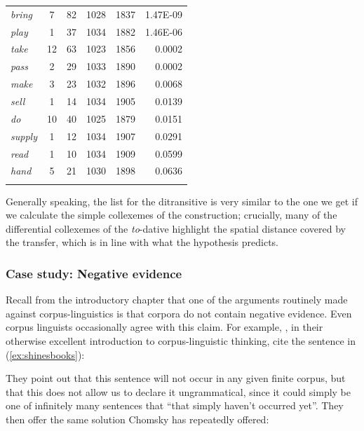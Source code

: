 \begin{table}[!htbp]
{\begin{tabular}[t]{l *{4}{S[table-format=5]} r}
\midrule
\textit{bring} & 7 & 82 & 1028 & 1837 & 1.47E-09 \\
\textit{play} & 1 & 37 & 1034 & 1882 & 1.46E-06 \\
\textit{take} & 12 & 63 & 1023 & 1856 & 0.0002 \\
\textit{pass} & 2 & 29 & 1033 & 1890 & 0.0002 \\
\textit{make} & 3 & 23 & 1032 & 1896 & 0.0068 \\
\textit{sell} & 1 & 14 & 1034 & 1905 & 0.0139 \\
\textit{do} & 10 & 40 & 1025 & 1879 & 0.0151 \\
\textit{supply} & 1 & 12 & 1034 & 1907 & 0.0291 \\
\textit{read} & 1 & 10 & 1034 & 1909 & 0.0599 \\
\textit{hand} & 5 & 21 & 1030 & 1898 & 0.0636 \\
\lspbottomrule
\end{tabular}}
\end{table}

Generally speaking, the list for the ditransitive is very similar to the one we get if we calculate the simple collexemes of the construction; crucially, many of the differential collexemes of the \textit{to}-dative highlight the spatial distance covered by the transfer, which is in line with what the hypothesis predicts.

\subsubsection{Case study: Negative evidence}
\label{sec:negativeevidence}

Recall from the introductory chapter that one of the arguments routinely made against corpus-linguistics is that corpora do not contain negative evidence. Even corpus linguists occasionally agree with this claim. For example, \citet[11]{mcenery_corpus_2001}, in their otherwise excellent introduction to corpus-linguistic thinking, cite the sentence in (\ref{ex:shinesbooks}):

\begin{exe}
\label{ex:shinesbooks}
\end{exe}

They point out that this sentence will not occur in any given finite corpus, but that this does not allow us to declare it ungrammatical, since it could simply be one of infinitely many sentences that ``that simply haven't occurred yet''. They then offer the same solution Chomsky has repeatedly offered:

